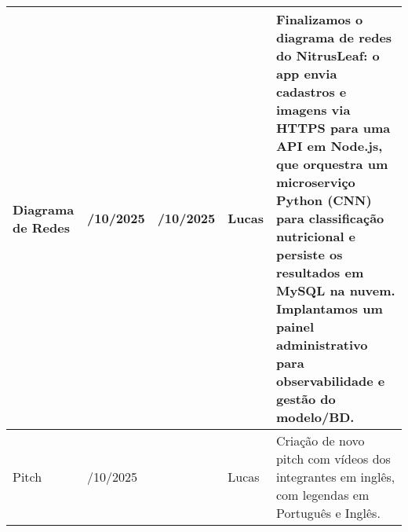 \documentclass[
    landscape,
    a4paper,
    12pt,
    english,
    brazilian,
]{article}
\begin{document}
\begin{longtable}{|m{4cm}|m{2.8cm}|m{2.8cm}|m{4.8cm}|m{8cm}|}
    \centering Diagrama de Redes & \centering 25/10/2025 & \centering 25/10/2025& \centering Lucas & Finalizamos o diagrama de redes do NitrusLeaf: o app envia cadastros e imagens via HTTPS para uma API em Node.js, que orquestra um microserviço Python (CNN) para classificação nutricional e persiste os resultados em MySQL na nuvem. Implantamos um painel administrativo para observabilidade e gestão do modelo/BD. \\ \hline
    \centering Pitch & \centering 25/10/2025 & \centering & \centering Lucas & Criação de novo pitch com vídeos dos integrantes em inglês, com legendas em Português e Inglês. \\ \hline

    
\end{longtable}  
\end{document}
